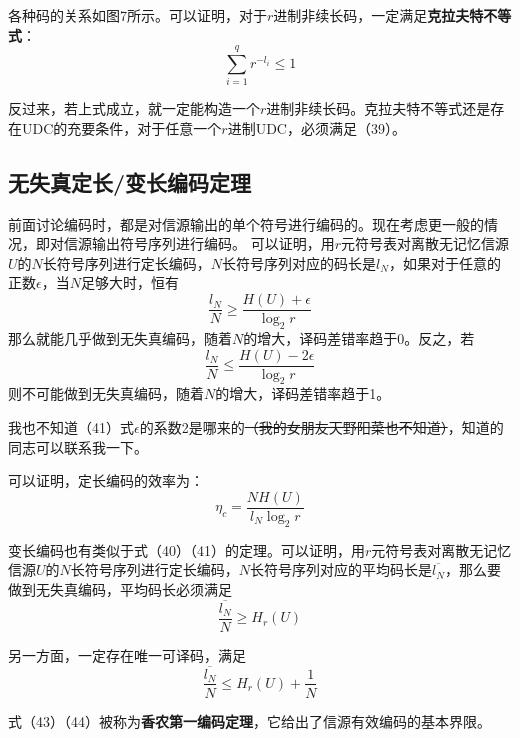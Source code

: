 \documentclass[UTF8,a4paper,11pt]{article}
\begin{document}
各种码的关系如图7所示。可以证明，对于$r$进制非续长码，一定满足\textbf{克拉夫特不等式}：
\begin{equation}
\sum_{i=1}^q r^{-l_i}\le 1
\end{equation}

反过来，若上式成立，就一定能构造一个$r$进制非续长码。克拉夫特不等式还是存在UDC的充要条件，对于任意一个$r$进制UDC，必须满足（39）。

\subsection{无失真定长/变长编码定理}
前面讨论编码时，都是对信源输出的单个符号进行编码的。现在考虑更一般的情况，即对信源输出符号序列进行编码。
可以证明，用$r$元符号表对离散无记忆信源$U$的$N$长符号序列进行定长编码，$N$长符号序列对应的码长是$l_N$，如果对于任意的正数$\epsilon$，当$N$足够大时，恒有
\begin{equation}
\frac{l_N}{N}\ge\frac{H(U)+\epsilon}{\log_{2}{r}}
\end{equation}
那么就能几乎做到无失真编码，随着$N$的增大，译码差错率趋于0。反之，若
\begin{equation}
\frac{l_N}{N}\le\frac{H(U)-2\epsilon}{\log_{2}{r}}
\end{equation}
则不可能做到无失真编码，随着$N$的增大，译码差错率趋于1。

我也不知道（41）式$\epsilon$的系数2是哪来的\sout{（我的女朋友天野阳菜也不知道）}，知道的同志可以联系我一下。

可以证明，定长编码的效率为：
\begin{equation}
\eta_c=\frac{NH(U)}{l_N\log_{2}{r}}
\end{equation}

变长编码也有类似于式（40）（41）的定理。可以证明，用$r$元符号表对离散无记忆信源$U$的$N$长符号序列进行定长编码，$N$长符号序列对应的平均码长是$\overline{l_N}$，那么要做到无失真编码，平均码长必须满足
\begin{equation}
\frac{\overline{l_N}}{N}\ge H_r(U)
\end{equation}

另一方面，一定存在唯一可译码，满足
\begin{equation}
\frac{\overline{l_N}}{N}\le H_r(U)+\frac{1}{N}
\end{equation}

式（43）（44）被称为\textbf{香农第一编码定理}，它给出了信源有效编码的基本界限。
\end{document}
